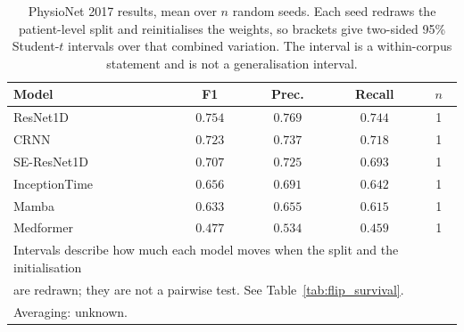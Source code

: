 \begin{table}[ht]
\centering
\caption{PhysioNet 2017 results, mean over $n$ random seeds. Each seed redraws the patient-level split and reinitialises the weights, so brackets give two-sided 95\% Student-$t$ intervals over that combined variation. The interval is a within-corpus statement and is not a generalisation interval.}
\label{tab:seed_af_classification}
\small
\begin{tabular}{lcccc}
\toprule
Model & F1 & Prec. & Recall & $n$ \\
\midrule
ResNet1D & $0.754$ & $0.769$ & $0.744$ & 1 \\
CRNN & $0.723$ & $0.737$ & $0.718$ & 1 \\
SE-ResNet1D & $0.707$ & $0.725$ & $0.693$ & 1 \\
InceptionTime & $0.656$ & $0.691$ & $0.642$ & 1 \\
Mamba & $0.633$ & $0.655$ & $0.615$ & 1 \\
Medformer & $0.477$ & $0.534$ & $0.459$ & 1 \\
\midrule
\multicolumn{5}{l}{\footnotesize Intervals describe how much each model moves when the split and the initialisation} \\
\multicolumn{5}{l}{\footnotesize are redrawn; they are not a pairwise test. See Table~\ref{tab:flip_survival}.} \\
\multicolumn{5}{l}{\footnotesize Averaging: unknown.} \\
\bottomrule
\end{tabular}
\end{table}
